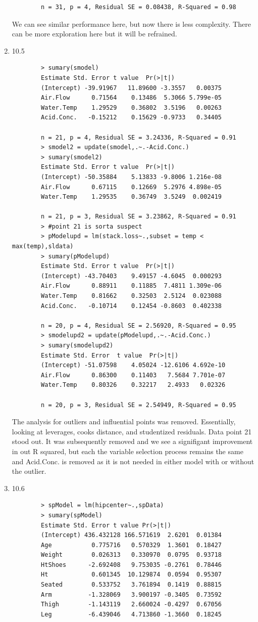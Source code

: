 \documentclass[11pt]{article}
\begin{document}
\begin{enumerate}
\begin{verbatim}
		n = 31, p = 4, Residual SE = 0.08438, R-Squared = 0.98
	\end{verbatim}
	We can see similar performance here, but now there is less complexity. There can be more exploration here but it will be refrained.
	\item 10.5
	\begin{verbatim}
		> sumary(smodel)
		Estimate Std. Error t value  Pr(>|t|)
		(Intercept) -39.91967   11.89600 -3.3557   0.00375
		Air.Flow      0.71564    0.13486  5.3066 5.799e-05
		Water.Temp    1.29529    0.36802  3.5196   0.00263
		Acid.Conc.   -0.15212    0.15629 -0.9733   0.34405
		
		n = 21, p = 4, Residual SE = 3.24336, R-Squared = 0.91
		> smodel2 = update(smodel,.~.-Acid.Conc.)
		> sumary(smodel2)
		Estimate Std. Error t value  Pr(>|t|)
		(Intercept) -50.35884    5.13833 -9.8006 1.216e-08
		Air.Flow      0.67115    0.12669  5.2976 4.898e-05
		Water.Temp    1.29535    0.36749  3.5249  0.002419
		
		n = 21, p = 3, Residual SE = 3.23862, R-Squared = 0.91
		> #point 21 is sorta suspect
		> pModelupd = lm(stack.loss~.,subset = temp < max(temp),sldata)
		> sumary(pModelupd)
		Estimate Std. Error t value  Pr(>|t|)
		(Intercept) -43.70403    9.49157 -4.6045  0.000293
		Air.Flow      0.88911    0.11885  7.4811 1.309e-06
		Water.Temp    0.81662    0.32503  2.5124  0.023088
		Acid.Conc.   -0.10714    0.12454 -0.8603  0.402338
		
		n = 20, p = 4, Residual SE = 2.56920, R-Squared = 0.95
		> smodelupd2 = update(pModelupd,.~.-Acid.Conc.)
		> sumary(smodelupd2)
		Estimate Std. Error  t value  Pr(>|t|)
		(Intercept) -51.07598    4.05024 -12.6106 4.692e-10
		Air.Flow      0.86300    0.11403   7.5684 7.701e-07
		Water.Temp    0.80326    0.32217   2.4933   0.02326
		
		n = 20, p = 3, Residual SE = 2.54949, R-Squared = 0.95
	\end{verbatim}
	The analysis for outliers and influential points was removed. Essentially, looking at leverages, cooks distance, and studentized residuals. Data point 21 stood out. It was subsequently removed and we see a signifigant improvement in out R squared, but each the variable selection process remains the same and Acid.Conc. is removed as it is not needed in either model with or without the outlier.
	\item 10.6
	\begin{verbatim}
		> spModel = lm(hipcenter~.,spData)
		> sumary(spModel)
		Estimate Std. Error t value Pr(>|t|)
		(Intercept) 436.432128 166.571619  2.6201  0.01384
		Age           0.775716   0.570329  1.3601  0.18427
		Weight        0.026313   0.330970  0.0795  0.93718
		HtShoes      -2.692408   9.753035 -0.2761  0.78446
		Ht            0.601345  10.129874  0.0594  0.95307
		Seated        0.533752   3.761894  0.1419  0.88815
		Arm          -1.328069   3.900197 -0.3405  0.73592
		Thigh        -1.143119   2.660024 -0.4297  0.67056
		Leg          -6.439046   4.713860 -1.3660  0.18245
		

\end{verbatim}
\end{enumerate}
\end{document}
